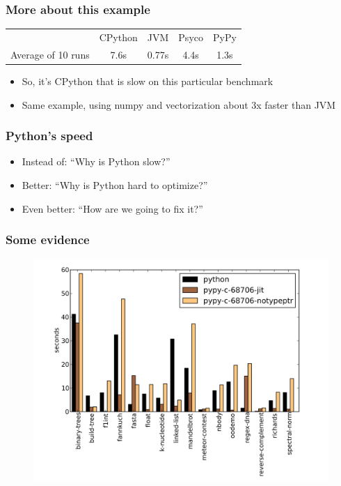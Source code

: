\documentclass[utf8x]{beamer}
\begin{document}
\begin{frame}
  \frametitle{More about this example}
  \begin{tabular}{| l | c | c | c | c |}
    \hline
    & CPython & JVM & Psyco & PyPy \\
    Average of 10 runs & 7.6s & 0.77s & 4.4s & 1.3s \\
    \hline
  \end{tabular}
  \vspace{.5cm}
  \pause
  \begin{itemize}
    \item So, it's CPython that is slow on this particular benchmark
      \pause
    \item Same example, using numpy and vectorization about 3x faster than JVM
  \end{itemize}
\end{frame}

\begin{frame}
  \frametitle{Python's speed}
  \begin{itemize}
    \item Instead of: ``Why is Python slow?''
      \pause
    \item Better: ``Why is Python hard to optimize?''
      \pause
    \item Even better: ``How are we going to fix it?''
  \end{itemize}
\end{frame}

\begin{frame}
  \frametitle{Some evidence}
  \begin{figure}
    \includegraphics[width=1.0\textwidth]{time.png}
  \end{figure}
\end{frame}
\end{document}
